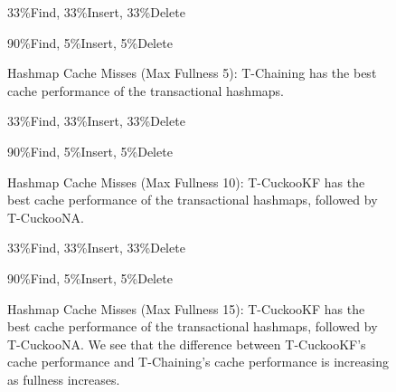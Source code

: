     \begin{figure}[H]
    \centering
        \begin{minipage}{0.75\textwidth}
        \centering
            \caption*{33\%Find, 33\%Insert, 33\%Delete}
            \vspace{12pt}
        \end{minipage}
        \begin{minipage}{0.75\textwidth}
            \centering
            \caption*{90\%Find, 5\%Insert, 5\%Delete}
        \end{minipage}
        \caption[Hashmap Cache Misses (Max Fullness 5)]{Hashmap Cache Misses (Max Fullness 5): T-Chaining has the best cache performance of the transactional hashmaps.}
		\label{fig:hm_cm5}
    \end{figure}

    \begin{figure}[H]
    \centering
        \begin{minipage}{0.75\textwidth}
        \centering
            \caption*{33\%Find, 33\%Insert, 33\%Delete}
            \vspace{12pt}
        \end{minipage}
        \begin{minipage}{0.75\textwidth}
            \centering
            \caption*{90\%Find, 5\%Insert, 5\%Delete}
        \end{minipage}
        \caption[Hashmap Cache Misses (Max Fullness 10)]{Hashmap Cache Misses (Max Fullness 10): T-CuckooKF has the best cache performance of the transactional hashmaps, followed by T-CuckooNA.}
		\label{fig:hm_cm10}
    \end{figure}

    \begin{figure}[H]
    \centering
        \begin{minipage}{0.75\textwidth}
        \centering
            \caption*{33\%Find, 33\%Insert, 33\%Delete}
            \vspace{12pt}
        \end{minipage}
        \begin{minipage}{0.75\textwidth}
            \centering
            \caption*{90\%Find, 5\%Insert, 5\%Delete}
        \end{minipage}
        \caption[Hashmap Cache Misses (Max Fullness 15)]{Hashmap Cache Misses (Max Fullness 15): T-CuckooKF has the best cache performance of the transactional hashmaps, followed by T-CuckooNA. We see that the difference between T-CuckooKF's cache performance and T-Chaining's cache performance is increasing as fullness increases.}
		\label{fig:hm_cm15}
    \end{figure}


